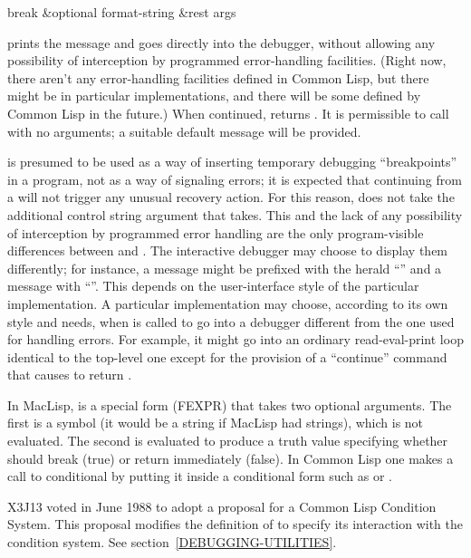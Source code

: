 \begin{defun}[Function]
break &optional format-string &rest args

\begin{obsolete}\noindent
{} prints the message and goes directly into the debugger,
without allowing 
any possibility of interception by programmed error-handling facilities.
(Right now, there aren't any error-handling facilities defined in Common Lisp,
but there might be in particular implementations, and there will be some
defined by Common Lisp in the future.)
When continued,  returns {\false}.  It is permissible to
call  with no arguments; a suitable default message will be provided.

 is presumed to be used as a way of inserting temporary debugging
``breakpoints'' in a program, not as a way of signaling errors;
it is expected that
continuing from a  will not trigger any unusual recovery action.
For this reason,  does not
take the additional  control string argument that 
takes.  This and the lack of any possibility of interception by programmed
error handling are the only program-visible differences between 
and .
The interactive debugger may choose to display them
differently; for instance, a  message might be prefixed with
the herald
``'' and a  message with
``''.  This depends on
the user-interface style of the particular implementation.  A particular
implementation may choose, according to its own style and needs,
when  is called to go
into a debugger different from the one used for handling errors.
For example, it might go into an ordinary read-eval-print loop identical to
the top-level one except for the provision of a ``continue'' command that
causes  to return {\false}.
\end{obsolete}

\beforenoterule
\begin{incompatibility}
In MacLisp,  is a special form (FEXPR)
that takes two optional arguments.  The first is a symbol (it would be a
string if MacLisp had strings), which is not evaluated.  The second is
evaluated to produce a truth value specifying whether  should
break (true) or return immediately (false).  In Common Lisp one makes a call
to  conditional by putting it inside a conditional form such as
 or .
\end{incompatibility}
\afternoterule

\begin{new}
X3J13 voted in June 1988
to adopt a proposal for a Common Lisp Condition System. 
This proposal modifies the definition of  to specify its interaction
with the condition system.  See section~\ref{DEBUGGING-UTILITIES}.
\end{new}
\end{defun}

